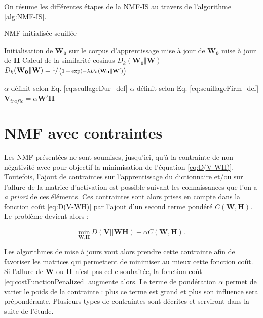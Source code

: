 On résume les différentes étapes de la NMF-IS au travers de l'algorithme \ref{alg:NMF-IS}.

\begin{algorithm}
\caption{NMF initialisée seuillée}
\begin{algorithmic}
\STATE Initialisation de $\mathbf{W_0}$ sur le corpus d'apprentissage
	\STATE mise à jour de $\mathbf{W_0}$
	\STATE mise à jour de $\mathbf{H}$
\ENDFOR
\STATE Calcul de la similarité cosinus $D_{k}(\mathbf{W_0} \Vert \mathbf{W})$
	\STATE $D_{k}(\mathbf{W_0} \Vert \mathbf{W}) = \sfrac{1}{\left(1+\exp({-\lambda D_{k}(\mathbf{W_0} \Vert \mathbf{W'})}\right)}$
\ENDIF

	\STATE $\alpha$ définit selon Eq. \ref{eq:seullageDur_def}
	\STATE $\alpha$ définit selon Eq. \ref{eq:seuillageFirm_def}
\ENDIF
\STATE $\mathbf{V}_{trafic} = \alpha \mathbf{W'H}$
\end{algorithmic}
\label{alg:NMF-IS}
\end{algorithm}


\section{NMF avec contraintes}\label{part:NMF_contrainte}
Les NMF présentées ne sont soumises, jusqu'ici, qu'à la contrainte de non-négativité avec pour objectif la minimisation de l'équation \ref{eq:D(V-WH)}. Toutefois, l'ajout de contraintes sur l'apprentissage du dictionnaire et/ou sur l'allure de la matrice d'activation est possible suivant les connaissances que l'on a \textit{a priori} de ces éléments. Ces contraintes sont alors prises en compte dans la fonction coût \ref{eq:D(V-WH)} par l'ajout d'un second terme pondéré $C(\mathbf{W},\mathbf{H})$. Le problème devient alors :

\begin{equation}\label{eq:costFunctionPenalized}
\underset{\textbf{W},\textbf{H}}{\text{min}}~D\left(\textbf{V} \vert\vert \textbf{WH}\right) + \alpha C(\mathbf{W},\mathbf{H}).
\end{equation}

Les algorithmes de mise à jours vont alors prendre cette contrainte afin de favoriser les matrices qui permettent de minimiser au mieux cette fonction coût. Si l'allure de $\mathbf{W}$ ou $\mathbf{H}$ n'est pas celle souhaitée, la fonction coût \ref{eq:costFunctionPenalized} augmente alors. Le terme de pondération $\alpha$ permet de varier le poids de la contrainte : plus ce terme est grand et plus son influence sera prépondérante. Plusieurs types de contraintes sont décrites et serviront dans la suite de l'étude.

